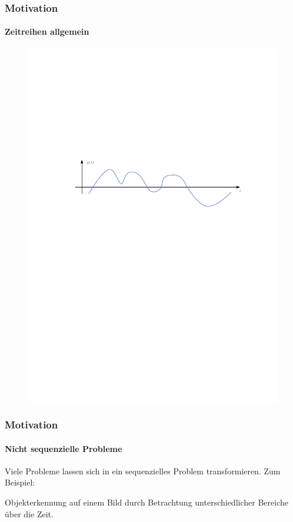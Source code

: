 \documentclass[german,aspectratio=169]{beamer}
\begin{document}
\begin{frame}
	\frametitle{Motivation}
	\framesubtitle{Zeitreihen allgemein}
	\begin{figure}
	\includegraphics[width=\textwidth]{timeseries}
\end{figure}
\end{frame}

\begin{frame}
	\frametitle{Motivation}
	\framesubtitle{Nicht sequenzielle Probleme}
	Viele Probleme lassen sich in ein sequenzielles Problem transformieren. Zum Beispiel:
	\begin{center}
		Objekterkennung auf einem Bild durch Betrachtung unterschiedlicher Bereiche über die Zeit.
	\end{center}
\end{frame}
\end{document}

